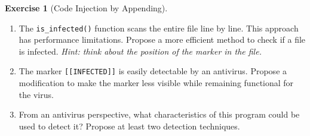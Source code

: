 \documentclass[a4paper,11pt]{article}
\theoremstyle{plain}
\theoremstyle{definition}
\newtheorem{exercice}{Exercise}
\begin{document}
\begin{exercice}[Code Injection by Appending]
\begin{enumerate}
\item The \texttt{is\_infected()} function scans the entire file line by line. This approach has performance limitations. Propose a more efficient method to check if a file is infected.
\textit{Hint: think about the position of the marker in the file.}

\item The marker \texttt{[[INFECTED]]} is easily detectable by an antivirus. Propose a modification to make the marker less visible while remaining functional for the virus.

\item From an antivirus perspective, what characteristics of this program could be used to detect it? Propose at least two detection techniques.
\end{enumerate}

\end{exercice}
\end{document}
